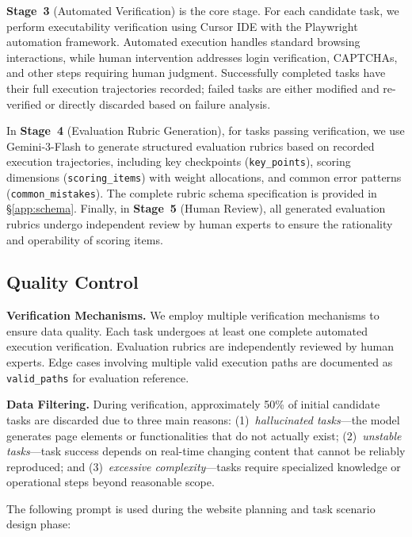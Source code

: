 \textbf{Stage~3} (Automated Verification) is the core stage. For each candidate task, we perform executability verification using Cursor IDE with the Playwright automation framework. Automated execution handles standard browsing interactions, while human intervention addresses login verification, CAPTCHAs, and other steps requiring human judgment. Successfully completed tasks have their full execution trajectories recorded; failed tasks are either modified and re-verified or directly discarded based on failure analysis.

In \textbf{Stage~4} (Evaluation Rubric Generation), for tasks passing verification, we use Gemini-3-Flash to generate structured evaluation rubrics based on recorded execution trajectories, including key checkpoints (\texttt{key\_points}), scoring dimensions (\texttt{scoring\_items}) with weight allocations, and common error patterns (\texttt{common\_mistakes}). The complete rubric schema specification is provided in \S\ref{app:schema}. Finally, in \textbf{Stage~5} (Human Review), all generated evaluation rubrics undergo independent review by human experts to ensure the rationality and operability of scoring items.

\subsection{Quality Control}

\textbf{Verification Mechanisms.} We employ multiple verification mechanisms to ensure data quality. Each task undergoes at least one complete automated execution verification. Evaluation rubrics are independently reviewed by human experts. Edge cases involving multiple valid execution paths are documented as \texttt{valid\_paths} for evaluation reference.

\textbf{Data Filtering.} During verification, approximately 50\% of initial candidate tasks are discarded due to three main reasons: (1)~\textit{hallucinated tasks}---the model generates page elements or functionalities that do not actually exist; (2)~\textit{unstable tasks}---task success depends on real-time changing content that cannot be reliably reproduced; and (3)~\textit{excessive complexity}---tasks require specialized knowledge or operational steps beyond reasonable scope.

\vspace{0.5em}
\noindent The following prompt is used during the website planning and task scenario design phase:


